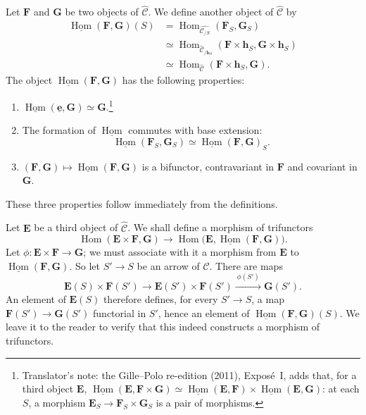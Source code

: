 Let \(\mathbf F\) and \(\mathbf G\) be two objects of
\(\widehat{\mathscr C}\). We define another object of
\(\widehat{\mathscr C}\) by
\begin{align*}
  \underline{\operatorname{Hom}}(\mathbf F,\mathbf G)(S)
  &={}\operatorname{Hom}_{\widehat{\mathscr C_{/S}}}
       (\mathbf F_S,\mathbf G_S)\\
  &\simeq\operatorname{Hom}_{\widehat{\mathscr C}_{/\mathbf h_S}}
       (\mathbf F\times\mathbf h_S,\mathbf G\times\mathbf h_S)\\
  &\simeq\operatorname{Hom}_{\widehat{\mathscr C}}
       (\mathbf F\times\mathbf h_S,\mathbf G).
\end{align*}
The object \(\underline{\operatorname{Hom}}(\mathbf F,\mathbf G)\) has
the following properties:
\begin{enumerate}
  \item[(i)]
    \(\underline{\operatorname{Hom}}(\underline{\mathbf e},\mathbf G)
      \simeq\mathbf G\).\footnote{Translator's note: the Gille--Polo re-edition (2011), Exposé~I, adds that, for a
third object \(\mathbf E\),
\(\underline{\operatorname{Hom}}(\mathbf E,\mathbf F\times\mathbf G)\simeq
\underline{\operatorname{Hom}}(\mathbf E,\mathbf F)\times
\underline{\operatorname{Hom}}(\mathbf E,\mathbf G)\): at each \(S\), a
morphism \(\mathbf E_S\to\mathbf F_S\times\mathbf G_S\) is a pair of
morphisms.}
  \item[\SGAInlineRefTarget{sga3:i:subsection:1:7:item:ii}(ii)] The formation of \(\underline{\operatorname{Hom}}\) commutes
    with base extension:
    \[
      \underline{\operatorname{Hom}}(\mathbf F_S,\mathbf G_S)
        \simeq
      \underline{\operatorname{Hom}}(\mathbf F,\mathbf G)_S.
    \]
  \item[(iii)]
    \((\mathbf F,\mathbf G)\mapsto
      \underline{\operatorname{Hom}}(\mathbf F,\mathbf G)\)
    is a bifunctor, contravariant in \(\mathbf F\) and covariant in
    \(\mathbf G\).
\end{enumerate}
These three properties follow immediately from the definitions.

Let \(\mathbf E\) be a third object of \(\widehat{\mathscr C}\). We shall
define a morphism of trifunctors
\[
  \operatorname{Hom}(\mathbf E\times\mathbf F,\mathbf G)
    \longrightarrow
  \operatorname{Hom}
    \bigl(\mathbf E,
      \underline{\operatorname{Hom}}(\mathbf F,\mathbf G)\bigr).
\]
Let \(\phi:\mathbf E\times\mathbf F\to\mathbf G\); we must associate
with it a morphism from \(\mathbf E\) to
\(\underline{\operatorname{Hom}}(\mathbf F,\mathbf G)\). So let
\(S'\to S\) be an arrow of \(\mathscr C\). There are maps
\[
  \mathbf E(S)\times\mathbf F(S')
    \longrightarrow
  \mathbf E(S')\times\mathbf F(S')
    \xrightarrow{\ \phi(S')\ }
  \mathbf G(S').
\]
An element of \(\mathbf E(S)\) therefore defines, for every \(S'\to S\),
a map \(\mathbf F(S')\to\mathbf G(S')\) functorial in \(S'\), hence an
element of \(\underline{\operatorname{Hom}}(\mathbf F,\mathbf G)(S)\). We
leave it to the reader to verify that this indeed constructs a morphism of
trifunctors.

